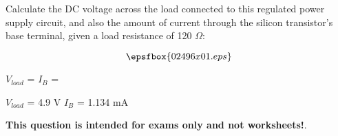 

Calculate the DC voltage across the load connected to this regulated power supply circuit, and also the amount of current through the silicon transistor's base terminal, given a load resistance of 120 $\Omega$:

$$\epsfbox{02496x01.eps}$$

$V_{load}$ = \hskip 80pt $I_B$ = 







$V_{load}$ = 4.9 V \hskip 50pt $I_B$ = 1.134 mA 







{\bf This question is intended for exams only and not worksheets!}.




